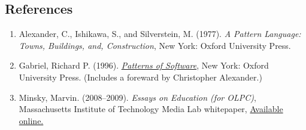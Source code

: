 \hypertarget{references}{%
\subsection{References}\label{references}}

\begin{enumerate}
\def\labelenumi{\arabic{enumi}.}
\item
  Alexander, C., Ishikawa, S., and Silverstein, M. (1977). \emph{A
  Pattern Language: Towns, Buildings, and, Construction}, New York:
  Oxford University Press.
\item
  Gabriel, Richard P. (1996).
  \emph{\href{http://dreamsongs.net/Files/PatternsOfSoftware.pdf}{Patterns
  of Software}}, New York: Oxford University Press. (Includes a foreward
  by Christopher Alexander.)
\item
  Minsky, Marvin. (2008--2009). \emph{Essays on Education (for
  {O}{L}{P}{C})}, Massachusetts Institute of Technology Media Lab
  whitepaper,
  \href{http://web.media.mit.edu/~minsky/OLPC-1.html}{Available online.}
\end{enumerate}
